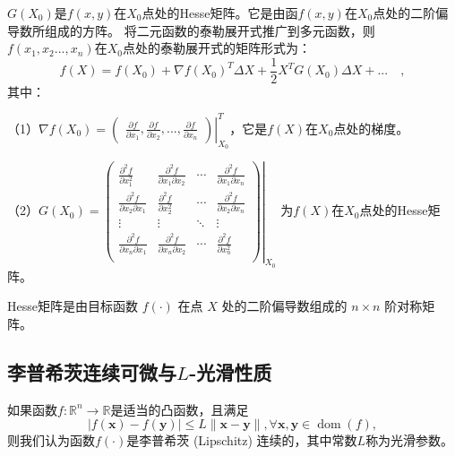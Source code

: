 $G(X_0)$是$f(x,y)$在$X_0$点处的Hesse矩阵。它是由函$f(x,y)$在$X_0$点处的二阶偏导数所组成的方阵。
将二元函数的泰勒展开式推广到多元函数，则$f(x_1,x_2...,x_n)$在$X_0$点处的泰勒展开式的矩阵形式为：
\begin{equation}
    f(X) = f(X_0) + \nabla f(X_0)^T\Delta X + \frac{1}{2}X^TG(X_0)\Delta X + ...\quad,
\end{equation}
其中：

（1）$\nabla f(X_0) =
    \left.
    \begin{pmatrix}
        \displaystyle\frac{\partial f}{\partial x_1},
        \displaystyle\frac{\partial f}{\partial x_2},
        ...,
        \displaystyle\frac{\partial f}{\partial x_n} 
    \end{pmatrix}\right|_{X_0}^T$，它是$f(X)$在$X_0$点处的梯度。
        
（2）$ G(X_0) = 
        \left.
        \begin{pmatrix}
            \displaystyle\frac{\partial^2f}{\partial x_1^2} & \displaystyle\frac{\partial^2f}{\partial x_1\partial x_2} & \cdots & \displaystyle\frac{\partial^2f}{\partial x_1\partial x_n}\\
            \displaystyle\frac{\partial^2f}{\partial x_2\partial x_1} & \displaystyle\frac{\partial^2f}{\partial x_2^2} & \cdots & \displaystyle\frac{\partial^2f}{\partial x_2\partial x_n}\\
            \vdots & \vdots & \ddots & \vdots\\
            \displaystyle\frac{\partial^2f}{\partial x_n\partial x_1} & \displaystyle\frac{\partial^2f}{\partial x_n\partial x_2} & \cdots & \displaystyle\frac{\partial^2f}{\partial x_n^2}\\
        \end{pmatrix}
        \right|_{X_0}$
        为$f(X)$在$X_0$点处的Hesse矩阵。
\begin{definition}[Hesse矩阵]
    Hesse矩阵是由目标函数 $f(\cdot)$ 在点 $X$ 处的二阶偏导数组成的 $n\times n$ 阶对称矩阵。       
\end{definition}

\subsection{李普希茨连续可微与$L$-光滑性质}
\begin{definition}[李普希茨连续]
    如果函数$f: \mathbb{R}^{n} \rightarrow \mathbb{R}$是适当的凸函数，且满足
\begin{equation}
    |f(\bm{x})-f(\bm{y})| \leq L\|\bm{x}-\bm{y}\|, \forall \bm{x}, \bm{y} \in \operatorname{dom}(f),
    \nonumber
\end{equation}
则我们认为函数$f(\cdot)$是李普希茨 (Lipschitz) 连续的，其中常数$L$称为光滑参数。
\end{definition}

